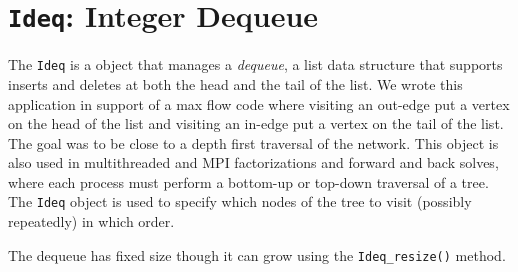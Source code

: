 \chapter{{\tt Ideq}: Integer Dequeue}
\par
The {\tt Ideq} is a object that manages a {\it dequeue},
a list data structure that supports inserts and deletes
at both the head and the tail of the list.
We wrote this application in support of a max flow code
where visiting an out-edge put a vertex on the head of the list
and visiting an in-edge put a vertex on the tail of the list.
The goal was to be close to a depth first traversal of the network.
This object is also used in multithreaded and MPI factorizations
and forward and back solves, where each process must perform a
bottom-up or top-down traversal of a tree.
The {\tt Ideq} object is used to specify which nodes of the tree to
visit (possibly repeatedly) in which order.
\par
The dequeue has fixed size though it can grow using the
{\tt Ideq\_resize()} method.
\par
